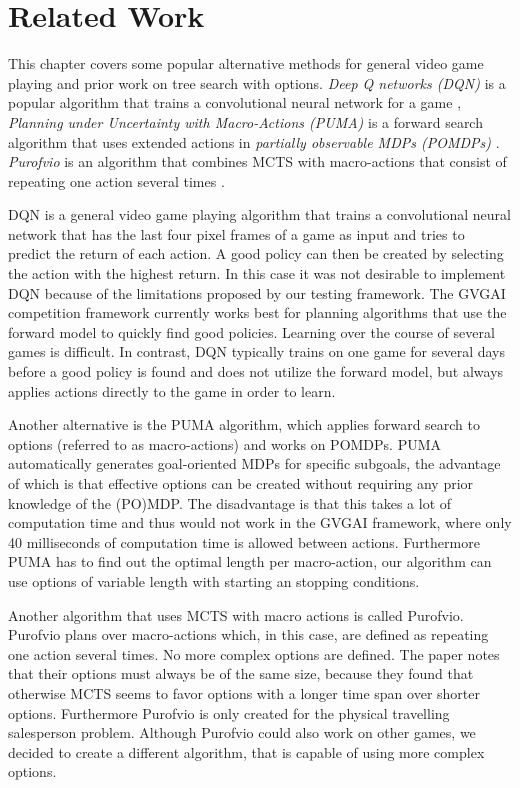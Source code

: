 \section{Related Work}
\label{sec:related}
This chapter covers some popular alternative methods for general video game
playing and prior work on tree search with options. \emph{Deep Q networks (DQN)}
is a popular algorithm that trains a convolutional neural network for a game
\cite{mnih2013playing}, \emph{Planning under Uncertainty with Macro-Actions
(PUMA)} is a forward search algorithm that uses extended actions in
\emph{partially observable MDPs (POMDPs)} \cite{he2010puma}. \emph{Purofvio} is
an algorithm that combines MCTS with macro-actions that consist of repeating one
action several times \cite{powley2012monte}.

DQN is a general video game playing algorithm that trains a convolutional neural
network that has the last four pixel frames of a game as input and tries to
predict the return of each action. A good policy can then be created by
selecting the action with the highest return. In this case it was not desirable
to implement DQN because of the limitations proposed by our testing framework.
The GVGAI competition framework currently works best for planning algorithms
that use the forward model to quickly find good policies. Learning over the
course of several games is difficult. In contrast, DQN typically trains on one
game for several days before a good policy is found and does not utilize the
forward model, but always applies actions directly to the game in order to
learn.


Another alternative is the PUMA algorithm, which applies forward search to
options (referred to as macro-actions) and works on POMDPs. PUMA automatically
generates goal-oriented MDPs for specific subgoals, the advantage of which is
that effective options can be created without requiring any prior knowledge of
the (PO)MDP. The disadvantage is that this takes a lot of computation time and
thus would not work in the GVGAI framework, where only 40 milliseconds of
computation time is allowed between actions. Furthermore PUMA has to find out the
optimal length per macro-action, our algorithm can use options of variable
length with starting an stopping conditions.

Another algorithm that uses MCTS with macro actions is called Purofvio.
Purofvio plans over macro-actions which, in this case, are defined as repeating
one action several times. No more complex options are defined. The paper notes
that their options must always be of the same size, because they found that
otherwise MCTS seems to favor options with a longer time span over shorter
options. Furthermore Purofvio is only created for the physical travelling
salesperson problem. Although Purofvio could also work on other games, we
decided to create a different algorithm, that is capable of using more complex
options.
